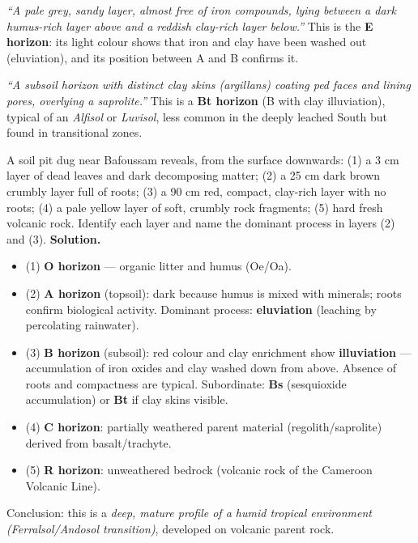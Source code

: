 \documentclass[11pt]{article}
\begin{document}
\begin{exemplebox}
\emph{``A pale grey, sandy layer, almost free of iron compounds, lying between a dark humus-rich layer above and a reddish clay-rich layer below.''} This is the \textbf{E horizon}: its light colour shows that iron and clay have been washed out (eluviation), and its position between A and B confirms it.
\end{exemplebox}

\begin{exemplebox}
\emph{``A subsoil horizon with distinct clay skins (argillans) coating ped faces and lining pores, overlying a saprolite.''} This is a \textbf{Bt horizon} (B with clay illuviation), typical of an \emph{Alfisol} or \emph{Luvisol}, less common in the deeply leached South but found in transitional zones.
\end{exemplebox}

\begin{exoresolu}
A soil pit dug near Bafoussam reveals, from the surface downwards: (1) a 3 cm layer of dead leaves and dark decomposing matter; (2) a 25 cm dark brown crumbly layer full of roots; (3) a 90 cm red, compact, clay-rich layer with no roots; (4) a pale yellow layer of soft, crumbly rock fragments; (5) hard fresh volcanic rock. Identify each layer and name the dominant process in layers (2) and (3).
\tcblower
\textbf{Solution.}
\begin{itemize}
\item (1) \textbf{O horizon} --- organic litter and humus (Oe/Oa).
\item (2) \textbf{A horizon} (topsoil): dark because humus is mixed with minerals; roots confirm biological activity. Dominant process: \textbf{eluviation} (leaching by percolating rainwater).
\item (3) \textbf{B horizon} (subsoil): red colour and clay enrichment show \textbf{illuviation} --- accumulation of iron oxides and clay washed down from above. Absence of roots and compactness are typical. Subordinate: \textbf{Bs} (sesquioxide accumulation) or \textbf{Bt} if clay skins visible.
\item (4) \textbf{C horizon}: partially weathered parent material (regolith/saprolite) derived from basalt/trachyte.
\item (5) \textbf{R horizon}: unweathered bedrock (volcanic rock of the Cameroon Volcanic Line).
\end{itemize}
Conclusion: this is a \emph{deep, mature profile of a humid tropical environment (Ferralsol/Andosol transition)}, developed on volcanic parent rock.
\end{exoresolu}
\end{document}
